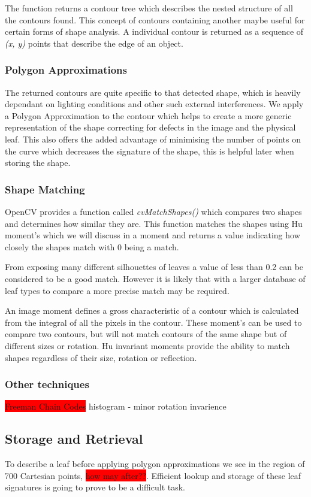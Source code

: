 The function returns a contour tree which describes the nested structure of all the contours found. This concept of contours containing another maybe useful for certain forms of shape analysis. A individual contour is returned as a sequence of \emph{(x, y)} points that describe the edge of an object.


\subsubsection{Polygon Approximations}
The returned contours are quite specific to that detected shape, which is heavily dependant on lighting conditions and other such external interferences. We apply a Polygon Approximation to the contour which helps to create a more generic representation of the shape correcting for defects in the image and the physical leaf. This also offers the added advantage of minimising the number of points on the curve which decreases the signature of the shape, this is helpful later when storing the shape.

\subsubsection{Shape Matching}
OpenCV provides a function called \emph{cvMatchShapes()} which compares two shapes and determines how similar they are. This function matches the shapes using Hu moment's which we will discuss in a moment and returns a value indicating how closely the shapes match with 0 being a match.

From exposing many different silhouettes of leaves a value of less than 0.2 can be considered to be a good match. However it is likely that with a larger database of leaf types to compare a more precise match may be required.

An image moment defines a gross characteristic of a contour which is calculated from the integral of all the pixels in the contour. These moment’s can be used to compare two contours, but will not match contours of the same shape but of different sizes or rotation. Hu invariant moments provide the ability to match shapes regardless of their size, rotation or reflection.

\subsubsection{Other techniques}
\colorbox{red}{Freeman Chain Codes} histogram - minor rotation invarience

\subsection{Storage and Retrieval}
To describe a leaf before applying polygon approximations we see in the region of 700 Cartesian points, \colorbox{red}{how may after??}. Efficient lookup and storage of these leaf signatures is going to prove to be a difficult task.

